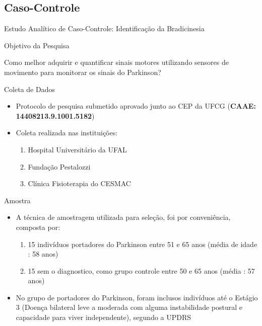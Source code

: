 \documentclass{beamer}
\begin{document}
\subsection{Caso-Controle}
\begin{frame}{Estudo Analítico de Caso-Controle: Identificação da Bradicinesia} 
    \begin{block}{Objetivo da Pesquisa}

    
    Como melhor adquirir e quantificar sinais motores utilizando sensores de movimento para monitorar os sinais do Parkinson?

    \end{block}
		\begin{block}{Coleta de Dados}
			\begin{itemize}
				\item Protocolo de pesquisa submetido aprovado junto ao CEP da UFCG (\textbf{CAAE: 14408213.9.1001.5182})
				\item Coleta realizada nas instituições:
					\begin{enumerate}
						\item Hospital Universitário da UFAL
						\item Fundação Pestalozzi
						\item Clínica Fisioterapia do CESMAC
				\end{enumerate}				
			\end{itemize}
    \end{block}
\end{frame}

\begin{frame}{Amostra} 
    \begin{block}{}
			\begin{itemize}
				\item A técnica de amostragem utilizada para seleção, foi por conveniência, composta por:
				\begin{enumerate}
					\item 15 indivíduos portadores do Parkinson entre 51 e 65 anos (média de idade : 58 anos)
					\item 15 sem o diagnostico, como grupo controle entre 50 e 65 anos (média : 57 anos)
				\end{enumerate}
					\item No grupo de portadores do Parkinson, foram inclusos indivíduos até o Estágio 3 (Doença bilateral leve a moderada com alguma instabilidade postural e capacidade para viver independente), segundo a UPDRS
				\end{itemize}
    \end{block}
\end{frame}
 
\end{document}
